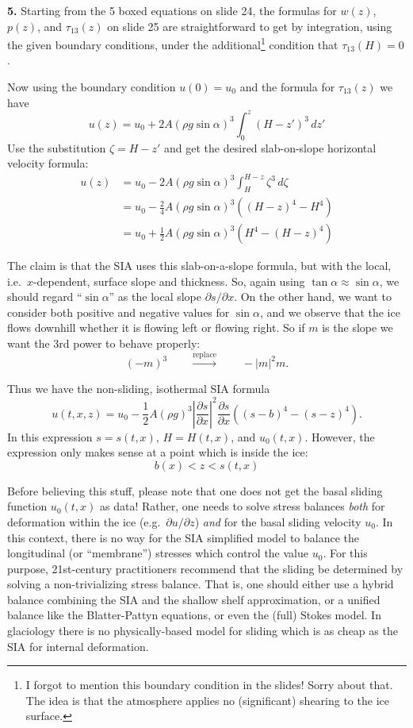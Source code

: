\documentclass[12pt]{amsart}
\newcommand{\prob}[1]{\bigskip\noindent\textbf{#1.}\quad }
\begin{document}
\prob{5}  Starting from the 5 boxed equations on slide 24, the formulas for $w(z)$, $p(z)$, and $\tau_{13}(z)$ on slide 25 are straightforward to get by integration, using the given boundary conditions, under the additional\footnote{I forgot to mention this boundary condition in the slides!  Sorry about that.  The idea is that the atmosphere applies no (significant) shearing to the ice surface.} condition that $\tau_{13}(H)=0$.

Now using the boundary condition $u(0)=u_0$ and the formula for $\tau_{13}(z)$ we have
    $$u(z) = u_0 + 2 A (\rho g \sin\alpha)^3 \int_0^z (H-z')^3\,dz'$$
Use the substitution $\zeta = H-z'$ and get the desired slab-on-slope horizontal velocity formula:
\begin{align*}
u(z) &= u_0 - 2 A (\rho g \sin\alpha)^3 \int_H^{H-z} \zeta^3\,d\zeta \\
     &= u_0 - \frac{2}{4} A (\rho g \sin\alpha)^3  \left((H-z)^4 - H^4\right) \\
     &= u_0 + \frac{1}{2} A (\rho g \sin\alpha)^3  \left(H^4 - (H-z)^4\right)
\end{align*}

The claim is that the SIA uses this slab-on-a-slope formula, but with the local, i.e.~$x$-dependent, surface slope and thickness.  So, again using $\tan\alpha \approx \sin\alpha$, we should regard ``$\sin\alpha$'' as the local slope $\partial s/\partial x$.  On the other hand, we want to consider both positive and negative values for $\sin\alpha$, and we observe that the ice flows downhill whether it is flowing left or flowing right.  So if $m$ is the slope we want the 3rd power to behave properly:
	$$(-m)^3 \qquad \stackrel{\text{replace}}{\to} \qquad -|m|^2 m.$$

Thus we have the non-sliding, isothermal SIA formula
    $$u(t,x,z) = u_0 - \frac{1}{2} A (\rho g)^3 \left|\frac{\partial s}{\partial x}\right|^2 \frac{\partial s}{\partial x} \left((s-b)^4 - (s-z)^4\right).$$
In this expression $s=s(t,x)$, $H=H(t,x)$, and $u_0(t,x)$.  However, the expression only makes sense at a point which is inside the ice:
	$$b(x) < z < s(t,x)$$

Before believing this stuff, please note that one does not get the basal sliding function $u_0(t,x)$ as data!  Rather, one needs to solve stress balances \emph{both} for deformation within the ice (e.g.~$\partial u/\partial z$) \emph{and} for the basal sliding velocity $u_0$.  In this context, there is no way for the SIA simplified model to balance the longitudinal (or ``membrane'') stresses which control the value $u_0$.  For this purpose, 21st-century practitioners recommend that the sliding be determined by solving a non-trivializing stress balance.  That is, one should either use a hybrid balance combining the SIA and the shallow shelf approximation, or a unified balance like the Blatter-Pattyn equations, or even the (full) Stokes model.  In glaciology there is no physically-based model for sliding which is as cheap as the SIA for internal deformation.
\end{document}
